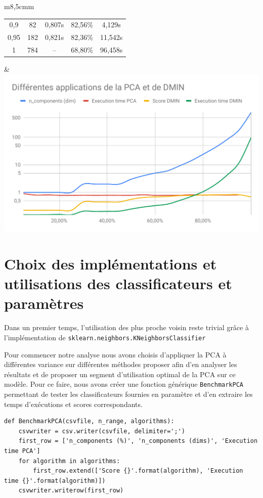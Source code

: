 \documentclass[12pt,a4paper]{article}
\begin{document}
{\begin{tabular}{m{}m{}}
\begin{tabular}{|c|c|c|c|c|}
        0,9          & 82             & 0,807s                   & 82,56\%          & 4,129s     \\
        0,95         & 182            & 0,821s                   & 82,36\%          & 11,542s    \\
        1            & 784            & --                       & 68,80\%          & 96,458s    \\
        \hline
    \end{tabular} & \includegraphics[scale=0.4]{PCA+DMIN.pdf} \\
\end{tabular}

\section{Choix des implémentations et utilisations des classificateurs et paramètres}

Dans un premier temps, l'utilisation des plus proche voisin reste trivial grâce à l'implémentation de \lstinline[style=default]|sklearn.neighbors.KNeighborsClassifier|

Pour commencer notre analyse nous avons choisis d'appliquer la PCA à différentes variance sur différentes méthodes proposer afin d'en analyser les résultats et de proposer un segment d'utilisation optimal de la PCA sur ce modèle. Pour ce faire, nous avons créer une fonction générique \lstinline[style=default]|BenchmarkPCA| permettant de tester les classificateurs fournies en paramètre et d'en extraire les temps d'exécutions et scores correspondants.
\begin{lstlisting}[style=darkula]
def BenchmarkPCA(csvfile, n_range, algorithms):
	csvwriter = csv.writer(csvfile, delimiter=';')
	first_row = ['n_components (%)', 'n_components (dims)', 'Execution time PCA']
	for algorithm in algorithms:
		first_row.extend(['Score {}'.format(algorithm), 'Execution time {}'.format(algorithm)])
	csvwriter.writerow(first_row)


\end{lstlisting}}
\end{document}
